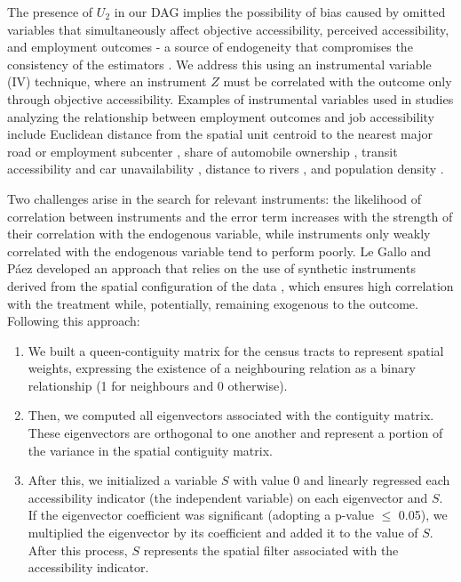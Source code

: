 \documentclass[preprint, 3p,
authoryear]{elsarticle} %
\providecommand{\tightlist}{%
  \setlength{\itemsep}{0pt}\setlength{\parskip}{0pt}}
\begin{document}
The presence of \(U_2\) in our DAG implies the possibility of bias
caused by omitted variables that simultaneously affect objective
accessibility, perceived accessibility, and employment outcomes - a
source of endogeneity that compromises the consistency of the estimators
\citep{antonakis2010, cunningham2021causal, huntington-klein2021}. We
address this using an instrumental variable (IV) technique, where an
instrument \(Z\) must be correlated with the outcome only through
objective accessibility. Examples of instrumental variables used in
studies analyzing the relationship between employment outcomes and job
accessibility include Euclidean distance from the spatial unit centroid
to the nearest major road or employment subcenter
\citep{delmelle2021, jin2018}, share of automobile ownership
\citep{Hu2017}, transit accessibility and car unavailability
\citep{johnson2017}, distance to rivers \citep{duarte2023, luz2022}, and
population density \citep{bastiaanssen2021, bastiaanssen2025}.

Two challenges arise in the search for relevant instruments: the
likelihood of correlation between instruments and the error term
increases with the strength of their correlation with the endogenous
variable, while instruments only weakly correlated with the endogenous
variable tend to perform poorly. Le Gallo and Páez
\citeyearpar{legallo2013} developed an approach that relies on the use
of synthetic instruments derived from the spatial configuration of the
data \citep[see][]{getis_comparative_2002, griffith_spatial_2003}, which
ensures high correlation with the treatment while, potentially,
remaining exogenous to the outcome. Following this approach:

\begin{enumerate}
\def\labelenumi{\arabic{enumi}.}
\tightlist
\item
  We built a queen-contiguity matrix for the census tracts to represent
  spatial weights, expressing the existence of a neighbouring relation
  as a binary relationship (1 for neighbours and 0 otherwise).
\item
  Then, we computed all eigenvectors associated with the contiguity
  matrix. These eigenvectors are orthogonal to one another and represent
  a portion of the variance in the spatial contiguity matrix.
\item
  After this, we initialized a variable \(S\) with value \(0\) and
  linearly regressed each accessibility indicator (the independent
  variable) on each eigenvector and \(S\). If the eigenvector
  coefficient was significant (adopting a p-value \(\leq\) 0.05), we
  multiplied the eigenvector by its coefficient and added it to the
  value of \(S\). After this process, \(S\) represents the spatial
  filter associated with the accessibility indicator.
\end{enumerate}
\end{document}
